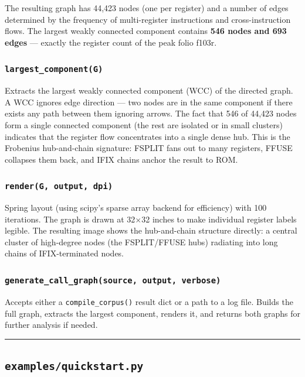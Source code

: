 \documentclass[12pt,a4paper]{article}
\begin{document}
The resulting graph has 44,423 nodes (one per register) and a number of edges determined by the frequency of multi-register instructions and cross-instruction flows. The largest weakly connected component contains \textbf{546 nodes and 693 edges} --- exactly the register count of the peak folio f103r.

\subsubsection{\texttt{largest\_component(G)}}

Extracts the largest weakly connected component (WCC) of the directed graph. A WCC ignores edge direction --- two nodes are in the same component if there exists any path between them ignoring arrows. The fact that 546 of 44,423 nodes form a single connected component (the rest are isolated or in small clusters) indicates that the register flow concentrates into a single dense hub. This is the Frobenius hub-and-chain signature: FSPLIT fans out to many registers, FFUSE collapses them back, and IFIX chains anchor the result to ROM.

\subsubsection{\texttt{render(G, output, dpi)}}

Spring layout (using scipy's sparse array backend for efficiency) with 100 iterations. The graph is drawn at 32$\times$32 inches to make individual register labels legible. The resulting image shows the hub-and-chain structure directly: a central cluster of high-degree nodes (the FSPLIT/FFUSE hubs) radiating into long chains of IFIX-terminated nodes.

\subsubsection{\texttt{generate\_call\_graph(source, output, verbose)}}

Accepts either a \texttt{compile\_corpus()} result dict or a path to a log file. Builds the full graph, extracts the largest component, renders it, and returns both graphs for further analysis if needed.

\begin{center}
\rule{0.5\textwidth}{0.4pt}
\end{center}

\subsection{\texttt{examples/quickstart.py}}
\end{document}
